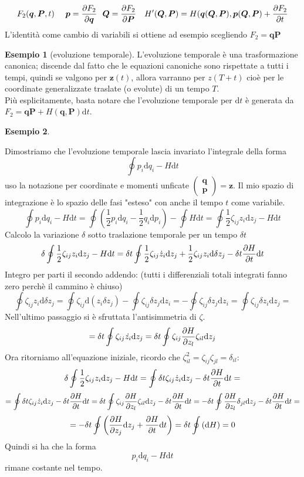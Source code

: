 \documentclass[a4paper,12pt]{article}
\theoremstyle{plain}
\renewcommand{\vec}[1]{{\boldsymbol{#1}}}
\theoremstyle{definition}
\newtheorem{exmp}{Esempio}[section]
\newcommand{\f}[2]{\frac{#1}{#2}}
\renewcommand{\d}{\text{d}}
\theoremstyle{remark}
\begin{document}
\[F_2(\vec{q},\vec{P},t)\:\:\:\:\:\:\vec{p}=\pdv{F_2}{\vec{q}}\:\:\:\vec{Q}=\pdv{F_2}{\vec{P}}\quad     H'(\vec{Q},\vec{P})=H(\vec{q}(\vec{Q},\vec{P}),\vec{p}(\vec{Q},\vec{P})+\pdv{F_2}{t}\]
L'identità come cambio di variabili si ottiene ad esempio scegliendo $F_2=\vec{q}\vec{P}$
\begin{exmp}[evoluzione temporale]
	L'evoluzione temporale è una trasformazione canonica; discende dal fatto che le equazioni canoniche sono rispettate a tutti i tempi, quindi se valgono per $\vec{z}(t)$, allora varranno per $z(T+t)$ cioè per le coordinate generalizzate traslate (o evolute) di un tempo $T$.\\
	Più esplicitamente, basta notare che l'evoluzione temporale per $\d t$ è generata da $F_2= \vec{q}\vec{P}+H(\vec{q},\vec{P})\d t$.
	\end{exmp}

\begin{exmp}\label{exmp2}
	
	
	Dimostriamo che l'evoluzione temporale lascia invariato l'integrale della forma \[\oint p_i \d q_i-H\d t\]uso la notazione per coordinate e momenti unficate $\begin{pmatrix}
	\vec{q}\\\vec{p}
	\end{pmatrix}=\vec{z}$. Il mio spazio di integrazione è lo spazio delle fasi "esteso" con anche il tempo $t$ come variabile.
	\[\oint p_i \d q_i-H\d t=\oint\left(\f{1}{2}p_i \d q_i-\f{1}{2}q_i \d p_i\right)-\oint H\d t=\oint	\f{1}{2}\zeta_{ij} z_i \d z_j-H\d t	\]
Calcolo la variazione $\delta$ sotto traslazione temporale per un tempo $\delta t$
	\[\delta\oint\f{1}{2}	\zeta_{ij} z_i \d z_j-H\d t=\delta t\oint\f{1}{2}	\zeta_{ij} \dot{z}_i \d z_j+\f{1}{2}\zeta_{ij} {z}_i \d \delta z_j-\delta t\pdv{H}{t}\d t\]
	Integro per parti il secondo addendo: (tutti i differenziali totali integrati fanno zero perchè il cammino è chiuso)
	\[	\oint\zeta_{ij} {z}_i \d \delta z_j =\oint	\zeta_{ij} \d \left( {z}_i\delta z_j	\right)	-\oint \zeta_{ij} \delta z_j \d z_i=-\oint \zeta_{ij} \delta z_j \d z_i=\oint \zeta_{ij} \delta z_i \d z_j=\]
	Nell'ultimo passaggio si è sfruttata l'antisimmetria di $\zeta$.
	\[=\delta t \oint \zeta_{ij} \dot{z_i} \d z_j	=\delta t \oint \zeta_{ij} \pdv{H}{z_l} \zeta_{il} \d z_j\]
	Ora ritorniamo all'equazione iniziale, ricordo che $\zeta^2_{il}=\zeta_{ij}\zeta_{jl}=\delta_{il}$:
	\[\delta\oint\f{1}{2}	\zeta_{ij} z_i \d z_j-H\d t=\oint\delta t	\zeta_{ij} \dot{z}_i \d z_j-\delta t\pdv{H}{t}\d t=\]\[=\oint\delta t	\zeta_{ij} \dot{z}_i \d z_j-\delta t\pdv{H}{t}\d t=\delta t\oint	\zeta_{ij} \pdv{H}{z_l} \zeta_{il} \d z_j-\delta t\pdv{H}{t}\d t=-\delta t\oint	 \pdv{H}{z_l} \delta_{jl} \d z_j-\delta t\pdv{H}{t}\d t=\]\[=-\delta t\oint\left( \pdv{H}{z_j}  \d z_j+\pdv{H}{t}\d t\right)=	\delta t\oint\left( \d H\right)=0\]
	Quindi si ha che la forma\[ p_i \d q_i-H\d t\]
	rimane costante nel tempo.
\end{exmp}
\end{document}
